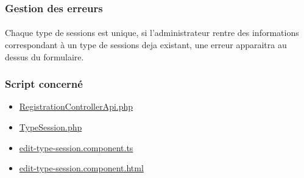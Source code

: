 \subsubsection{Gestion des erreurs}
	\paragraph{}
		Chaque type de sessions est unique, si l'administrateur rentre des informations correspondant à un type de sessions deja existant, une erreur apparaitra au dessus du formulaire.
		
\subsubsection{Script concerné}
	\begin{itemize}
		\item \href{https://github.com/victorsmits/Aquabike/blob/master/backend/src/Controller/API/RegistrationControllerApi.php}{RegistrationControllerApi.php}
		\item \href{https://github.com/victorsmits/Aquabike/blob/master/backend/src/Entity/TypeSession.php}{TypeSession.php}
		\item \href{https://github.com/victorsmits/Aquabike/blob/master/frontend/src/app/type-session/edit-type-session.component.ts}{edit-type-session.component.ts}
		\item \href{https://github.com/victorsmits/Aquabike/blob/master/frontend/src/app/type-session/edit-type-session.component.html}{edit-type-session.component.html}
	\end{itemize}
